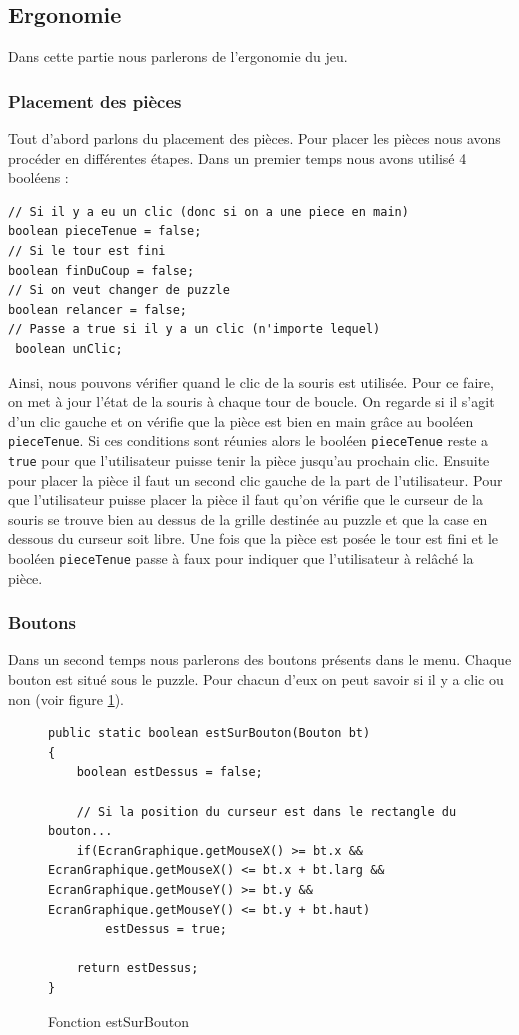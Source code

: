 \documentclass[]{article}
\newcommand{\variable}[1]{\noindent \texttt{#1}}
\begin{document}
\newpage
\subsection{Ergonomie}

Dans cette partie nous parlerons de l'ergonomie du jeu.
\subsubsection{Placement des pièces}
Tout d'abord parlons du placement des pièces.
Pour placer les pièces nous avons procéder en différentes étapes. Dans un premier temps nous avons utilisé 4 booléens : 
\begin{lstlisting}
// Si il y a eu un clic (donc si on a une piece en main)
boolean pieceTenue = false;
// Si le tour est fini
boolean finDuCoup = false;
// Si on veut changer de puzzle
boolean relancer = false;
// Passe a true si il y a un clic (n'importe lequel)
 boolean unClic;
\end{lstlisting}

Ainsi, nous pouvons vérifier quand le clic de la souris est utilisée. 
Pour ce faire, on met à jour l'état de la souris à chaque tour de boucle. On regarde si il s'agit d'un clic gauche et on vérifie que la pièce est bien en main grâce au booléen \variable{pieceTenue}. Si ces conditions sont réunies alors le booléen \variable{pieceTenue} reste a \variable{true} pour que l'utilisateur puisse tenir la pièce jusqu'au prochain clic. Ensuite pour placer la pièce il faut un second clic gauche de la part de  l'utilisateur.
Pour que l'utilisateur puisse placer la pièce il faut qu'on vérifie que le curseur de la souris se trouve bien au dessus de la grille destinée au puzzle et que la case en dessous du curseur soit libre. Une fois que la pièce est posée le tour est fini et le booléen \variable{pieceTenue} passe à faux pour indiquer que l'utilisateur à relâché la pièce.

\subsubsection{Boutons}
Dans un second temps nous parlerons des boutons présents dans le menu. 
Chaque bouton est situé sous le puzzle.  Pour chacun d'eux on peut savoir si il y a clic ou non (voir figure \no\ref{Fonction estSurBouton}).

\begin{figure}[hpt]
	\center
	\caption{\label{Fonction estSurBouton} Fonction estSurBouton}
\begin{lstlisting}
public static boolean estSurBouton(Bouton bt)
{
    boolean estDessus = false;

    // Si la position du curseur est dans le rectangle du bouton...
    if(EcranGraphique.getMouseX() >= bt.x && EcranGraphique.getMouseX() <= bt.x + bt.larg && EcranGraphique.getMouseY() >= bt.y && EcranGraphique.getMouseY() <= bt.y + bt.haut)
        estDessus = true;

    return estDessus;
}
\end{lstlisting}
\end{figure}
\end{document}
